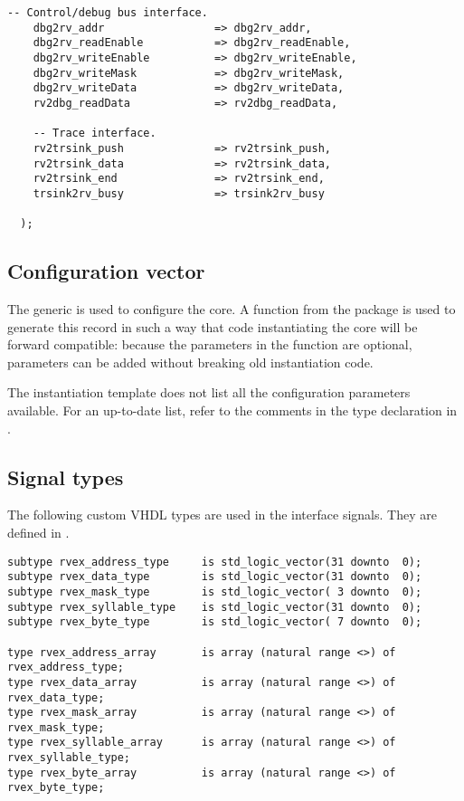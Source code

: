 \documentclass[main.tex]{subfiles}
\begin{document}
\begin{lstlisting}[numbers=none, basicstyle=\tiny]
    -- Control/debug bus interface.
    dbg2rv_addr                 => dbg2rv_addr,
    dbg2rv_readEnable           => dbg2rv_readEnable,
    dbg2rv_writeEnable          => dbg2rv_writeEnable,
    dbg2rv_writeMask            => dbg2rv_writeMask,
    dbg2rv_writeData            => dbg2rv_writeData,
    rv2dbg_readData             => rv2dbg_readData,
    
    -- Trace interface.
    rv2trsink_push              => rv2trsink_push,
    rv2trsink_data              => rv2trsink_data,
    rv2trsink_end               => rv2trsink_end,
    trsink2rv_busy              => trsink2rv_busy
    
  );

\end{lstlisting}

\clearpage
\subsection{Configuration vector}

The  generic is used to configure the \rvex{} core. A function from the  package is used to generate this record in such a way that code instantiating the core will be forward compatible: because the parameters in the function are optional, parameters can be added without breaking old instantiation code.

The instantiation template does not list all the configuration parameters available. For an up-to-date list, refer to the comments in the  type declaration in .

\subsection{Signal types}

The following custom VHDL types are used in the interface signals. They are defined in .

\begin{lstlisting}[numbers=none]
subtype rvex_address_type     is std_logic_vector(31 downto  0);
subtype rvex_data_type        is std_logic_vector(31 downto  0);
subtype rvex_mask_type        is std_logic_vector( 3 downto  0);
subtype rvex_syllable_type    is std_logic_vector(31 downto  0);
subtype rvex_byte_type        is std_logic_vector( 7 downto  0);

type rvex_address_array       is array (natural range <>) of rvex_address_type;
type rvex_data_array          is array (natural range <>) of rvex_data_type;
type rvex_mask_array          is array (natural range <>) of rvex_mask_type;
type rvex_syllable_array      is array (natural range <>) of rvex_syllable_type;
type rvex_byte_array          is array (natural range <>) of rvex_byte_type;
\end{lstlisting}
\end{document}
